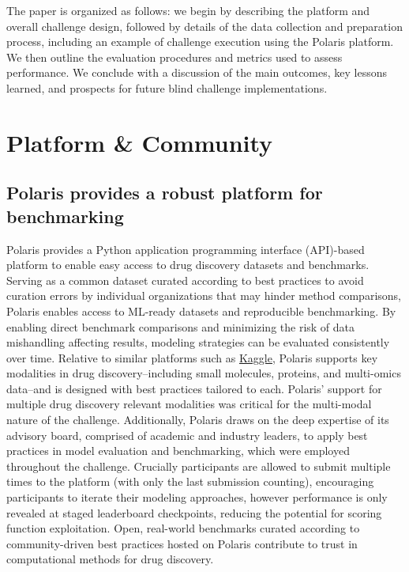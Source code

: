 \documentclass[journal=jcim,manuscript=article]{achemso}
\begin{document}
The paper is organized as follows: we begin by describing the platform and overall challenge design, followed by details of the data collection and preparation process, including an example of challenge execution using the Polaris platform. We then outline the evaluation procedures and metrics used to assess performance. We conclude with a discussion of the main outcomes, key lessons learned, and prospects for future blind challenge implementations.

\section{Platform \& Community}

\subsection{Polaris provides a robust platform for benchmarking}

 Polaris provides a Python application programming interface (API)-based platform to enable easy access to drug discovery datasets and benchmarks. Serving as a common dataset curated according to best practices to avoid curation errors by individual organizations that may hinder method comparisons, Polaris enables access to ML-ready datasets and reproducible benchmarking\cite{Polaris_website, wognum_call_2024}. By enabling direct benchmark comparisons and minimizing the risk of data mishandling affecting results, modeling strategies can be evaluated consistently over time. Relative to similar platforms such as \href{kaggle.com}{Kaggle}, Polaris supports key modalities in drug discovery--including small molecules, proteins, and multi-omics data--and is designed with best practices tailored to each. Polaris' support for multiple drug discovery relevant modalities was critical for the multi-modal nature of the challenge.  Additionally, Polaris draws on the deep expertise of its advisory board, comprised of academic and industry leaders, to apply best practices in model evaluation and benchmarking\cite{ash_practically_2024}, which were employed throughout the challenge. Crucially participants are allowed to submit multiple times to the platform (with only the last submission counting), encouraging participants to iterate their modeling approaches, however performance is only revealed at staged leaderboard checkpoints, reducing the potential for scoring function exploitation.  Open, real-world benchmarks curated according to community-driven best practices hosted on Polaris contribute to trust in computational methods for drug discovery.
\end{document}
